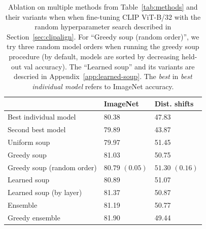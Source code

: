 \documentclass[nohyperref]{article}
\theoremstyle{plain}
\theoremstyle{definition}
\theoremstyle{remark}
\begin{document}
        \begin{table}[t!]
            \caption{Ablation on multiple methods from Table~\ref{tab:methods} and their variants when 
            when fine-tuning CLIP ViT-B/32 with the random hyperparameter search described in Section~\ref{sec:clipalign}. 
            For ``Greedy soup (random order)'', we try three random model orders when running the greedy soup procedure
            (by default, models are sorted by decreasing held-out val accuracy).
            The ``Learned soup'' and its variants are descried in Appendix~\ref{app:learned-soup}.
            The \emph{best} in \emph{best individual model} refers to ImageNet accuracy.}
                        \vspace*{-0.2cm}
            \begin{center}\footnotesize
            \setlength{\arrayrulewidth}{.01em}
            \begin{tabular}{lll}
                \toprule
                {} &              ImageNet &            Dist. shifts\\
                \midrule
                Best individual model        &           80.38 &          47.83 \\
                Second best model &           79.89 &         43.87 \\
                \midrule
                Uniform soup                                 &           79.97 &          51.45 \\
                Greedy soup &           81.03 &          50.75 \\
                Greedy soup (random order)               &  $80.79$ $\scriptstyle(0.05)$ &  $51.30$ $\scriptstyle(0.16)$ \\
                Learned soup                             &           80.89 &          51.07 \\
                Learned soup (by layer)                  &           81.37 &          50.87 \\
                \midrule
                Ensemble                &           81.19 &          50.77 \\
                Greedy ensemble           &            81.90 &          49.44 \\
                \bottomrule
            \end{tabular}
                        \vspace*{-0.4cm}
            \end{center}
            \label{tab:results}
        \end{table}
\end{document}
